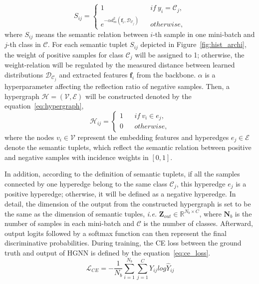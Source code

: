 \begin{equation}\label{eq:semantic_tuplet}
S_{ij} = \left\{\begin{matrix}
1 &  & if \ y_{i} = \mathcal{C}_j, \\ 
e^{-\alpha d_{m}^{2}(\textbf{f}_i,\mathcal{D}_{\mathcal{C}_j})}   & & otherwise,
\end{matrix}\right.
\end{equation}
where $S_{ij}$ means the semantic relation between $i$-th sample in one mini-batch and $j$-th class in $\mathcal{C}$. 
For each semantic tuplet $S_{ij}$ depicted in Figure~\ref{fig:hist_archi}, the weight of positive samples for class $\mathcal{C}_j$ will be assigned to 1; otherwise, the weight-relation will be regulated by the measured distance between learned distributions $\mathcal{D}_{\mathcal{C}_j}$ and extracted features $\textbf{f}_i$ from the backbone. $\alpha$ is a hyperparameter affecting the reflection ratio of negative samples. Then, a hypergraph $\mathcal{H} = (\mathcal{V}, \mathcal{E})$ will be constructed denoted by the equation~\ref{eq:hypergraph}, 
\begin{equation}\label{eq:hypergraph}
\mathcal{H}_{ij} = \left\{\begin{matrix}
1 &  & if \ v_{i} \in e_j, \\ 
0   & & otherwise,
\end{matrix}\right.
\end{equation} 
where the nodes $v_i \in \mathcal{V}$ represent the embedding features and hyperedges $e_j \in \mathcal{E}$ denote the semantic tuplets, which reflect the semantic relation between positive and negative samples with incidence weights in $[0,1]$.

In addition, according to the definition of semantic tuplets, if all the samples connected by one hyperedge belong to the same class $\mathcal{C}_j$, this hyperedge $e_j$ is a positive hyperedge; otherwise, it will be defined as a negative hyperedge. In detail, the dimension of the output from the constructed hypergraph is set to be the same as the dimension of semantic tuples, \textit{i.e.} $\textbf{Z}_{out} \in \mathbb{R}^{N_b \times C}$, where $\textbf{N}_b$ is the number of samples in each mini-batch and $\mathcal{C}$ is the number of classes. Afterward, output logits followed by a softmax function can then represent the final discriminative probabilities. During training, the CE loss between the ground truth and output of HGNN is defined by the equation~\ref{eq:ce_loss}.
\begin{equation}\label{eq:ce_loss}
\mathcal{L}_{CE} = -\frac{1}{N_{b}}\sum_{i=1}^{N_{b}}\sum_{j=1}^{C}Y_{ij}log\widehat{Y}_{ij}
\end{equation}

